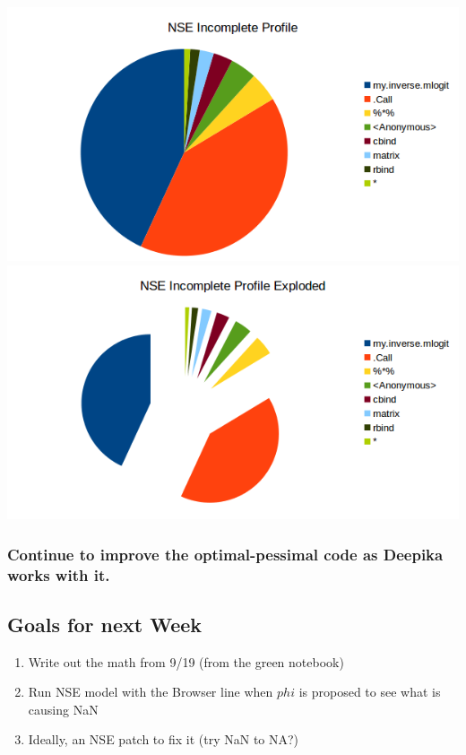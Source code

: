 \includegraphics{data/NSE_IncompleteProfile}
\includegraphics{data/NSE_IncompleteProfilexplode}



\subsubsection{Continue to improve the optimal-pessimal code as Deepika works with it.}





\subsection{Goals for next Week}
\begin{enumerate}
\item Write out the math from 9/19 (from the green notebook)
\item Run NSE model with the Browser line when $phi$ is proposed to see what is causing NaN
\item Ideally, an NSE patch to fix it (try NaN to NA?)
\end{enumerate}


